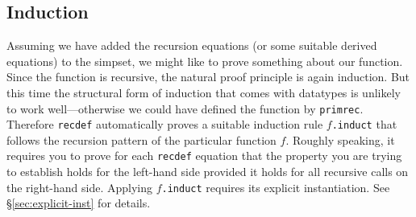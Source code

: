 \subsection{Induction}

Assuming we have added the recursion equations (or some suitable derived
equations) to the simpset, we might like to prove something about our
function. Since the function is recursive, the natural proof principle is
again induction. But this time the structural form of induction that comes
with datatypes is unlikely to work well---otherwise we could have defined the
function by \texttt{primrec}. Therefore \texttt{recdef} automatically proves
a suitable induction rule $f$\texttt{.induct} that follows the recursion
pattern of the particular function $f$. Roughly speaking, it requires you to
prove for each \texttt{recdef} equation that the property you are trying to
establish holds for the left-hand side provided it holds for all recursive
calls on the right-hand side. Applying $f$\texttt{.induct} requires its
explicit instantiation. See \S\ref{sec:explicit-inst} for details.

